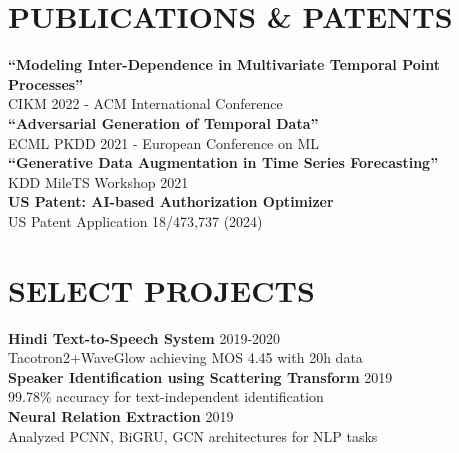 \documentclass[letterpaper,11pt]{article}
\begin{document}
\begin{minipage}[t]{0.64\textwidth}
\vspace{10pt}
\section{PUBLICATIONS \& PATENTS}

\small
\textbf{``Modeling Inter-Dependence in Multivariate Temporal Point Processes''} \\
\textcolor{mediumgray}{CIKM 2022 - ACM International Conference} \\[2pt]

\textbf{``Adversarial Generation of Temporal Data''} \\
\textcolor{mediumgray}{ECML PKDD 2021 - European Conference on ML} \\[2pt]

\textbf{``Generative Data Augmentation in Time Series Forecasting''} \\
\textcolor{mediumgray}{KDD MileTS Workshop 2021} \\[2pt]

\textbf{US Patent: AI-based Authorization Optimizer} \\
\textcolor{mediumgray}{US Patent Application 18/473,737 (2024)}

\vspace{10pt}
\section{SELECT PROJECTS}

\small
\textbf{Hindi Text-to-Speech System} \hfill \textcolor{mediumgray}{2019-2020} \\
Tacotron2+WaveGlow achieving MOS 4.45 with 20h data \\[2pt]

\textbf{Speaker Identification using Scattering Transform} \hfill \textcolor{mediumgray}{2019} \\
99.78\% accuracy for text-independent identification \\[2pt]

\textbf{Neural Relation Extraction} \hfill \textcolor{mediumgray}{2019} \\
Analyzed PCNN, BiGRU, GCN architectures for NLP tasks

\end{minipage}
\end{document}
